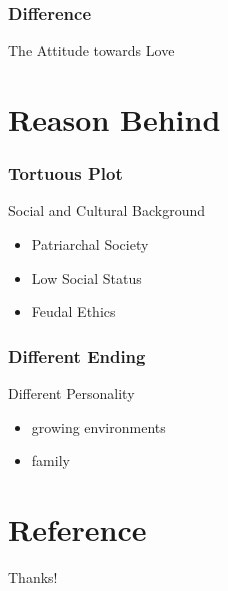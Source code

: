\documentclass{beamer}
\begin{document}
\begin{frame}
    \frametitle{Difference}
    \Huge
    \begin{center}
        The Attitude towards Love
    \end{center}
\end{frame}

\section{Reason Behind}

\begin{frame}
    \frametitle{Tortuous Plot}
    \Large
    \begin{block}{Social and Cultural Background}
        \begin{itemize}
            \item Patriarchal Society
            \item Low Social Status
            \item Feudal Ethics
        \end{itemize} 
    \end{block}
\end{frame}

\begin{frame}
    \frametitle{Different Ending}
    \huge
    \begin{block}{Different Personality}
        \begin{itemize}[<+->]
            \item growing environments
            \item family
        \end{itemize}
    \end{block}
\end{frame}

\section{Reference}

\begin{frame}[allowframebreaks]
    
    
\end{frame}

\begin{frame}
    \begin{center}
        {\Huge\calligra Thanks!}\cite{origin}
    \end{center}
\end{frame}
\end{document}
